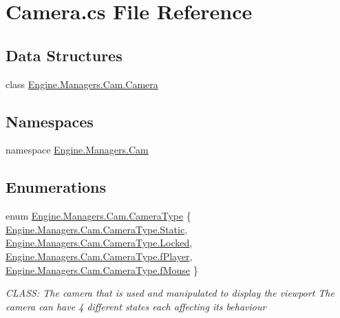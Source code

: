 \hypertarget{a00149}{}\section{Camera.\+cs File Reference}
\label{a00149}
\subsection*{Data Structures}
\begin{DoxyCompactItemize}
\item 
class \hyperlink{a00490}{Engine.\+Managers.\+Cam.\+Camera}
\end{DoxyCompactItemize}
\subsection*{Namespaces}
\begin{DoxyCompactItemize}
\item 
namespace \hyperlink{a00267}{Engine.\+Managers.\+Cam}
\end{DoxyCompactItemize}
\subsection*{Enumerations}
\begin{DoxyCompactItemize}
\item 
enum \hyperlink{a00267_aa40b88e1e953e36c54409ee9727c238b}{Engine.\+Managers.\+Cam.\+Camera\+Type} \{ \hyperlink{a00267_aa40b88e1e953e36c54409ee9727c238ba84a8921b25f505d0d2077aeb5db4bc16}{Engine.\+Managers.\+Cam.\+Camera\+Type.\+Static}, 
\hyperlink{a00267_aa40b88e1e953e36c54409ee9727c238bad0f2e5376298c880665077b565ffd7dd}{Engine.\+Managers.\+Cam.\+Camera\+Type.\+Locked}, 
\hyperlink{a00267_aa40b88e1e953e36c54409ee9727c238ba31cdf8a7c73745646adfa4b58fbfcecf}{Engine.\+Managers.\+Cam.\+Camera\+Type.\+f\+Player}, 
\hyperlink{a00267_aa40b88e1e953e36c54409ee9727c238ba63066f67ab8fc99b91bcaeb6559739af}{Engine.\+Managers.\+Cam.\+Camera\+Type.\+f\+Mouse}
 \}\begin{DoxyCompactList}\small\item\em C\+L\+A\+SS\+: The camera that is used and manipulated to display the viewport The camera can have 4 different states each affecting it\textquotesingle{}s behaviour \end{DoxyCompactList}
\end{DoxyCompactItemize}
